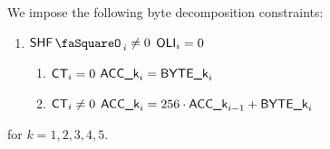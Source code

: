 We impose the following byte decomposition constraints:
\begin{enumerate}
	\item \If $\shfStamp_{i} \neq 0$ \et $\textsf{OLI}_{i} = 0$ \Then
	\begin{enumerate}
		\item \If $\textsf{CT}_{i} = 0$ \Then $\textsf{ACC}\textsf{\_k}_{i} = \textsf{BYTE}\textsf{\_k}_i$
		\item \If $\textsf{CT}_{i} \neq 0$ \Then $\textsf{ACC}\textsf{\_k}_{i} = 256 \cdot \textsf{ACC}\textsf{\_k}_{i - 1} + \textsf{BYTE}\textsf{\_k}_i$
	\end{enumerate}
\end{enumerate}
for $k = 1,2,3,4,5$.